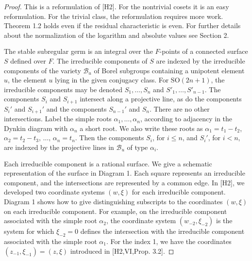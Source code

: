 \documentclass{amsart}
\begin{document}
\medskip
\noindent
\begin{proof}  This is a  reformulation of [H2].  For the nontrivial
cosets it is an easy reformulation.  For the trivial class, the
reformulation requires more work.  Theorem 1.2 holds even if the
residual characteristic is even.  For further details about the
normalization of the logarithm and absolute values see Section 2.

The
stable subregular germ is an integral over the $F$-points
of a connected surface $S$ defined over $F$.  The 
irreducible components of $S$ are indexed by the irreducible components
of the variety ${\mathcal B}_u$ of Borel subgroups containing
a unipotent element $u$,  the element $u$ lying in the
given conjugacy class.
For $\text{SO}(2n+1)$, the irreducible components may be denoted
$S_1,\ldots,S_n$ and $S'_1,\ldots,S'_{n-1}$.  The 
components $S_i$ and $S_{i+1}$ intersect along a projective
line, as do the components $S_i'$ and $S_{i+1}'$ and
the components $S_{n-1}'$ and $S_n$.  There are no other intersections.
Label the simple roots $\alpha_1,\ldots,\alpha_n$,
according to adjacency in the Dynkin diagram with $\alpha_n$ a
short root. We also write these roots as $\alpha_1=t_1-t_2$,
$\alpha_2=t_2-t_3$, $\ldots$, $\alpha_n = t_n$.
Then
the components $S_i$, for $i\le n$, and $S_i'$,
for $i<n$, are indexed by the projective lines
in ${\mathcal B}_u$
of type $\alpha_i$. 



Each irreducible component is a rational surface.  
We give a schematic representation of the surface
in Diagram 1.  Each square represents an irreducible component,
and the intersections are represented by a common edge.  In
[H2], we developed two coordinate systems $(w,\xi)$ for each
irreducible component.  Diagram 1 shows how to give
distinguishing subscripts to the coordinates $(w,\xi)$ on
each irreducible component.  For example, on the irreducible component
associated with the simple root $\alpha_2$, the coordinate
system $(w_{-2},\xi_{-2})$ is the system for which
$\xi_{-2}=0$ defines the intersection with the irreducible
component associated with the simple root $\alpha_1$.
For the index 1, we have the coordinates
$(z_{-1},\xi_{-1})=(z,\xi)$ 
introduced in [H2,VI,Prop. 3.2].

\medskip


\end{proof}
\end{document}
